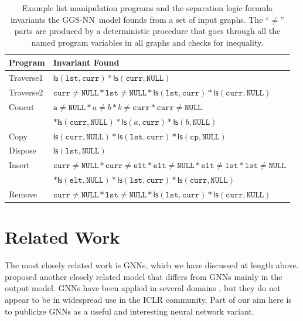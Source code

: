 \documentclass{article} %
\newcommand{\SLls}[0]{\ensuremath{\mathsf{ls}}}
\newcommand{\SLnull}{\texttt{NULL}}
\newcommand{\SLcurr}{\texttt{curr}}
\newcommand{\SLlst}{\texttt{lst}}
\newcommand{\SLelt}{\texttt{elt}}
\newcommand{\OurMethodShort}{GGS-NN}
\begin{document}
\begin{table}
\begin{center}
\begin{tabular}{ll}
\toprule
Program & Invariant Found \\
\midrule
Traverse1 & $\SLls(\SLlst,\SLcurr) * \SLls(\SLcurr,\SLnull)$ \\
Traverse2 & $ \SLcurr \ne \SLnull *
\SLlst \ne \SLnull * \SLls(\SLlst,\SLcurr) * \SLls(\SLcurr,\SLnull)$ \\
Concat & $\texttt{a} \ne \SLnull * a \ne b * b \ne \SLcurr * \SLcurr\ne
\SLnull$ \\
& $* \SLls(\SLcurr, \SLnull) * \SLls(a, \SLcurr) * \SLls(b, \SLnull)$ \\
Copy & $\SLls(\SLcurr, \SLnull) * \SLls(\SLlst, \SLcurr) * \SLls(\texttt{cp},
\SLnull) $ \\
Dispose & $\SLls(\SLlst, \SLnull)$ \\
Insert & $\SLcurr\ne\SLnull * \SLcurr\ne \SLelt * \SLelt\ne \SLnull * \SLelt\ne
\SLlst* \SLlst\ne \SLnull$ \\
& $* \SLls(\SLelt, \SLnull) * \SLls(\SLlst, \SLcurr) * \SLls(\SLcurr, \SLnull)$ \\
Remove & $\SLcurr\ne \SLnull * \SLlst\ne \SLnull * \SLls(\SLlst, \SLcurr) *
\SLls(\SLcurr, \SLnull)$ \\
\bottomrule
\end{tabular}
\caption{Example list manipulation programs and the separation logic formula
invariants the \OurMethodShort~model founds from a set of input graphs. The
``$\ne$'' parts are produced by
a deterministic procedure that goes through all the named program variables in
all graphs and checks for inequality.}
\label{table:seplogic-list-invariants}
\end{center}
\end{table}



\section{Related Work}

The most closely related work is GNNs, which we have discussed at
length above.
\cite{micheli2009neural} proposed another
closely related model that differs from GNNs mainly in the output model.
GNNs have been applied in several domains
\citep{gori2005new,di2006comparison,scarselli2009graph,uwents2011neural}, but they
do not appear to be in widespread use in the ICLR community.
Part of our aim here is to publicize GNNs as a useful and interesting
neural network variant. 
\end{document}
